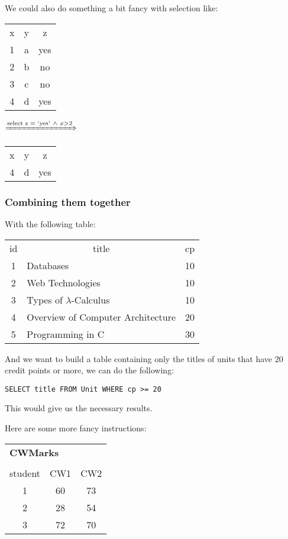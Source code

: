 \documentclass[11pt,a4paper,titlepage,dvipsnames,cmyk]{scrartcl}
\begin{document}
We could also do something a bit fancy with selection like:

\begin{center}
    \begin{tabular}{c|c|c}
        x & y & z \\
        \hhline{=|=|=}
        1 & a & yes \\
        2 & b & no \\
        3 & c & no \\
        4 & d & yes
    \end{tabular}
    \quad \quad $\xRightarrow{\text{select z = `yes'} \ \wedge \ x>2}$
    \quad \quad
    \begin{tabular}{c|c|c}
        x & y & z \\ \hhline{=|=|=}
        4 & d & yes
    \end{tabular}
\end{center}

\subsubsection{Combining them together}%
\label{ssub:combining}
With the following table:

\begin{center}
    \begin{tabular}{c|l|c}
        id & \multicolumn{1}{|c|}{title} & cp \\ \hhline{=|=|=}
        1 & Databases & 10 \\
        2 & Web Technologies & 10 \\
        3 & Types of $\lambda$-Calculus & 10 \\
        4 & Overview of Computer Architecture & 20 \\
        5 & Programming in C & 30 \\
    \end{tabular}
\end{center}

And we want to build a table containing only the titles of units that have
20 credit points or more, we can do the following:

\begin{lstlisting}[]
SELECT title FROM Unit WHERE cp >= 20
\end{lstlisting}

This would give us the necessary results.

Here are some more fancy instructions: 

\begin{center}
    \begin{tabular}{c|c|c}
        \multicolumn{3}{l}{\textbf{CWMarks}} \\
        \multicolumn{3}{c}{}
        \\
        student & CW1 & CW2 \\ \hhline{=|=|=}
        1 & 60 & 73 \\
        2 & 28 & 54 \\
        3 & 72 & 70
    \end{tabular}
\end{center}
\end{document}
